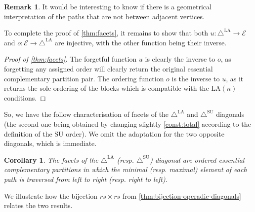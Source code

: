 \documentclass{amsart}
\newtheorem{corollary}[theorem]{Corollary}
\theoremstyle{definition}
\newtheorem{remark}[theorem]{Remark}
\newcommand{\SU}{\mathrm{SU}}
\newcommand{\LA}{\mathrm{LA}}
\newcommand{\SUD}{\triangle^{\mathrm{SU}}}
\newcommand{\LAD}{\triangle^{\mathrm{LA}}}
\newcommand{\EC}{\mathcal{E}} %
\begin{document}
\begin{remark}
    It would be interesting to know if there is a geometrical interpretation of the paths that are not between adjacent vertices. 
\end{remark}

To complete the proof of \cref{thm:facets}, it remains to show that both $u:\LAD \to \EC$ and $o:\EC\to \LAD$ are injective, with the other function being their inverse.

\begin{proof}[{Proof of \cref{thm:facets}}]
The forgetful function $u$ is clearly the inverse to $o$, as forgetting any assigned order will clearly return the original essential complementary partition pair. 
The ordering function $o$ is the inverse to $u$, as it returns the sole ordering of the blocks which is compatible with the $\LA(n)$ conditions.
\end{proof}

So, we have the follow characterisation of facets of the $\LAD$ and $\SUD$ diagonals (the second one being obtained by changing slightly \cref{const:total} according to the definition of the $\SU$ order).
We omit the adaptation for the two opposite diagonals, which is immediate.

\begin{corollary} 
\label{prop:LAD-ordered-EC}
The facets of the $\LAD$ (resp. $\SUD$) diagonal are ordered essential complementary partitions in which the minimal (resp. maximal) element of each path is traversed from left to right (resp. right to left).
\end{corollary}

We illustrate how the bijection $rs\times rs$ from \cref{thm:bijection-operadic-diagonals} relates the two results.
\end{document}
